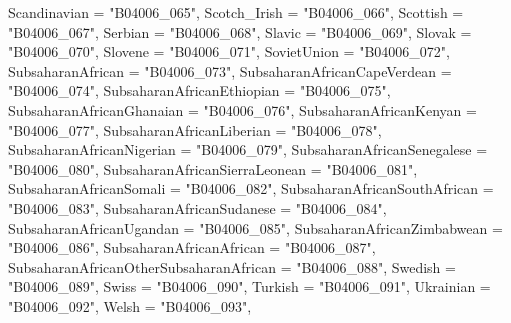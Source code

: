 \documentclass[
]{article}
\newenvironment{Shaded}{\begin{snugshade}}{\end{snugshade}}
\newcommand{\DataTypeTok}[1]{\textcolor[rgb]{0.13,0.29,0.53}{#1}}
\newcommand{\NormalTok}[1]{#1}
\newcommand{\StringTok}[1]{\textcolor[rgb]{0.31,0.60,0.02}{#1}}
\begin{document}
\begin{Shaded}
\begin{Highlighting}[]
                   \DataTypeTok{Scandinavian =} \StringTok{"B04006_065"}\NormalTok{,}
                   \DataTypeTok{Scotch_Irish =} \StringTok{"B04006_066"}\NormalTok{,}
                   \DataTypeTok{Scottish =} \StringTok{"B04006_067"}\NormalTok{,}
                   \DataTypeTok{Serbian =} \StringTok{"B04006_068"}\NormalTok{,}
                   \DataTypeTok{Slavic =} \StringTok{"B04006_069"}\NormalTok{,}
                   \DataTypeTok{Slovak =} \StringTok{"B04006_070"}\NormalTok{,}
                   \DataTypeTok{Slovene =} \StringTok{"B04006_071"}\NormalTok{,}
                   \DataTypeTok{SovietUnion =} \StringTok{"B04006_072"}\NormalTok{,}
                   \DataTypeTok{SubsaharanAfrican =} \StringTok{"B04006_073"}\NormalTok{,}
                   \DataTypeTok{SubsaharanAfricanCapeVerdean =} \StringTok{"B04006_074"}\NormalTok{,}
                   \DataTypeTok{SubsaharanAfricanEthiopian =} \StringTok{"B04006_075"}\NormalTok{,}
                   \DataTypeTok{SubsaharanAfricanGhanaian =} \StringTok{"B04006_076"}\NormalTok{,}
                   \DataTypeTok{SubsaharanAfricanKenyan =} \StringTok{"B04006_077"}\NormalTok{,}
                   \DataTypeTok{SubsaharanAfricanLiberian =} \StringTok{"B04006_078"}\NormalTok{,}
                   \DataTypeTok{SubsaharanAfricanNigerian =} \StringTok{"B04006_079"}\NormalTok{,}
                   \DataTypeTok{SubsaharanAfricanSenegalese =} \StringTok{"B04006_080"}\NormalTok{,}
                   \DataTypeTok{SubsaharanAfricanSierraLeonean =} \StringTok{"B04006_081"}\NormalTok{,}
                   \DataTypeTok{SubsaharanAfricanSomali =} \StringTok{"B04006_082"}\NormalTok{,}
                   \DataTypeTok{SubsaharanAfricanSouthAfrican =} \StringTok{"B04006_083"}\NormalTok{,}
                   \DataTypeTok{SubsaharanAfricanSudanese =} \StringTok{"B04006_084"}\NormalTok{,}
                   \DataTypeTok{SubsaharanAfricanUgandan =} \StringTok{"B04006_085"}\NormalTok{,}
                   \DataTypeTok{SubsaharanAfricanZimbabwean =} \StringTok{"B04006_086"}\NormalTok{,}
                   \DataTypeTok{SubsaharanAfricanAfrican =} \StringTok{"B04006_087"}\NormalTok{,}
                   \DataTypeTok{SubsaharanAfricanOtherSubsaharanAfrican =} \StringTok{"B04006_088"}\NormalTok{,}
                   \DataTypeTok{Swedish =} \StringTok{"B04006_089"}\NormalTok{,}
                   \DataTypeTok{Swiss =} \StringTok{"B04006_090"}\NormalTok{,}
                   \DataTypeTok{Turkish =} \StringTok{"B04006_091"}\NormalTok{,}
                   \DataTypeTok{Ukrainian =} \StringTok{"B04006_092"}\NormalTok{,}
                   \DataTypeTok{Welsh =} \StringTok{"B04006_093"}\NormalTok{,}

\end{Highlighting}
\end{Shaded}
\end{document}
